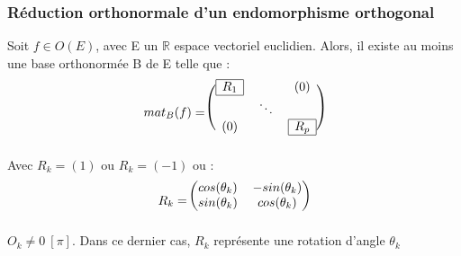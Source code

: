 \subsubsection{Réduction orthonormale d'un endomorphisme orthogonal}
\begin{theo}
Soit $f \in O(E)$, avec E un $\mathbb{R}$ espace vectoriel euclidien. Alors, il existe au moins une base orthonormée B de E telle que : 
\[mat_B(f) = \begin{blockarray}{ccc}
        \begin{block}{(ccc)}
         \mesbloc{R_1}  &  & (0)   \\
                            &\ddots      &  \\
         (0)                &  & \mesbloc{R_p}  \\
        \end{block}
        \end{blockarray}
\] 
Avec $R_k = (1)$ ou $R_k = (-1)$ ou :
\[R_k = \begin{blockarray}{cc}
        \begin{block}{(cc)}
         cos(\theta_k)  &  -sin(\theta_k)   \\
         sin(\theta_k)  & cos(\theta_k)  \\
        \end{block}
        \end{blockarray}
\] 
$O_k \neq 0~ [\pi]$. Dans ce dernier cas, $R_k$ représente une rotation d'angle $\theta_k$
\end{theo}
